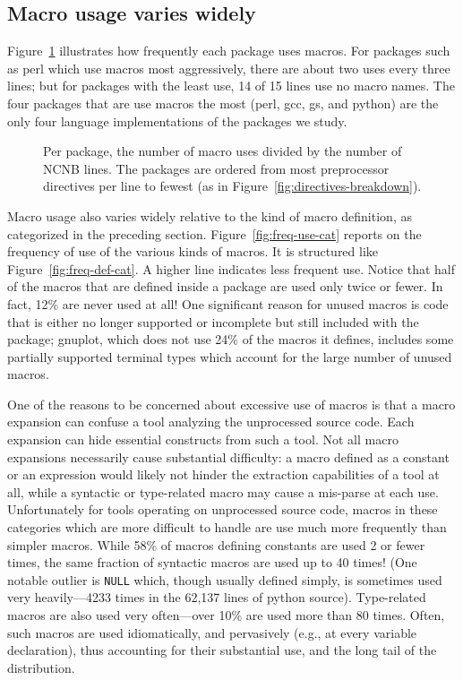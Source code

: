 \documentclass[10pt]{article}
\newcommand{\pkg}[1]{\textsf{#1}}
\newcommand{\captionsmall}[1]{\caption[]{\small #1}}
\begin{document}
\subsection{Macro usage varies widely}

Figure~\ref{fig:use-per-line} illustrates how frequently each package
uses macros.  For packages such as \pkg{perl} which use macros most
aggressively, there are about two uses every three lines;  but for
packages with the least use, 14 of 15 lines use no macro names.
The four packages that are use macros the most
(\pkg{perl}, \pkg{gcc}, \pkg{gs}, and \pkg{python}) are the
only four language implementations of the packages we study.

\begin{figure}
\centerline{}
\captionsmall{Per package, the number of macro uses divided by the number of
  NCNB lines.  The packages are ordered from most preprocessor
  directives per line to fewest (as in
  Figure~\ref{fig:directives-breakdown}).}
\label{fig:use-per-line}
\end{figure}

Macro usage also varies widely relative to the kind of macro definition,
as categorized in the preceding section.  Figure~\ref{fig:freq-use-cat}
reports on the frequency of use of the various kinds of macros.  It is
structured like Figure~\ref{fig:freq-def-cat}.  A higher line indicates less frequent use.
Notice that half of the macros that are defined inside a package are
used only twice or fewer.  In fact, 12\% are never used at all!  One
significant reason for unused macros is code that is either no longer
supported or incomplete but still included with the package;
\pkg{gnuplot}, which does not use 24\% of the macros it defines,
includes some partially supported terminal types which account for the
large number of unused macros.

One of the reasons to be concerned about excessive use of macros is that
a macro expansion can confuse a tool analyzing the unprocessed source
code.  Each expansion can hide essential constructs from such a tool.
Not all macro expansions necessarily cause substantial difficulty: a
macro defined as a constant or an expression would likely not hinder the
extraction capabilities of a tool at all, while a syntactic or
type-related macro may cause a mis-parse at each use.  Unfortunately for
tools operating on unprocessed source code, macros in these categories which are more
difficult to handle are use much more frequently
than simpler macros.  While 58\% of macros defining constants are
used 2 or fewer times, the same fraction of syntactic macros are used up
to 40 times!  (One notable outlier is \texttt{NULL} which, though usually
defined simply, is sometimes used very heavily---4233 times in the
62,137 lines of \pkg{python} source). Type-related macros are also used
very often---over 10\% are used more than 80 times.  Often, such macros
are used idiomatically, and pervasively (e.g., at every variable
declaration), thus accounting for their substantial use, and the long
tail of the distribution.
\end{document}
